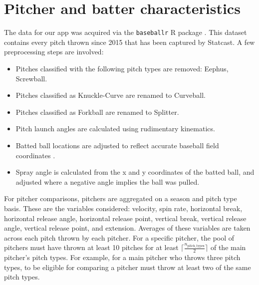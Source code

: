 \documentclass[11pt]{article}
\begin{document}
\section{Pitcher and batter characteristics}

The data for our app was acquired via the \texttt{baseballr} R package \citep{baseballr}. This dataset contains every pitch thrown since 2015 that has been captured by Statcast. A few preprocessing steps are involved:
\begin{itemize}
    \item Pitches classified with the following pitch types are removed: Eephus, Screwball.
    \item Pitches classified as Knuckle-Curve are renamed to Curveball.
    \item Pitches classified as Forkball are renamed to Splitter.
    \item Pitch launch angles are calculated using rudimentary kinematics.
    \item Batted ball locations are adjusted to reflect accurate baseball field coordinates \citep{petti2017research}.
    \item Spray angle is calculated from the x and y coordinates of the batted ball, and adjusted where a negative angle implies the ball was pulled.
\end{itemize}

For pitcher comparisons, pitchers are aggregated on a season and pitch type basis. These are the variables considered: velocity, spin rate, horizontal break, horizontal release angle, horizontal release point, vertical break, vertical release angle, vertical release point, and extension. Averages of these variables are taken across each pitch thrown by each pitcher.
For a specific pitcher, the pool of pitchers must have thrown at least 10 pitches for at least $\lceil \frac{n_{\text{pitch\_types}}}{2} \rceil$ of the main pitcher's pitch types. For example, for a main pitcher who throws three pitch types, to be eligible for comparing a pitcher must throw at least two of the same pitch types.
\end{document}
